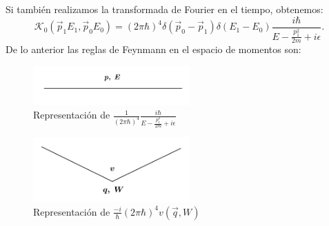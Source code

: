 Si también realizamos la transformada de Fourier en el tiempo, obtenemos:
\begin{equation}
\mathcal{K}_0(\vec{p}_1E_1,\vec{p}_0E_0)=(2\pi\hbar)^4\delta(\vec{p}_0-\vec{p}_1)\delta(E_1-E_0)\frac{i\hbar}{E-\frac{p_{1}^{2}}{2m}+i\epsilon}.
\end{equation}
De lo anterior las reglas de Feynmann en el espacio de momentos son:
\begin{figure}
\caption[Diagrama de Feynmann primera cuantización]{Representación de $\frac{1}{(2\pi\hbar)^4}\frac{i\hbar}{E-\frac{p_{1}^{2}}{2m}+i\epsilon}$}
\includegraphics[width=6cm]{Imagenes/Fig6}
\end{figure}
\begin{figure}
\caption[Diagrama de Feynmann primera cuantización]{Representación de $\frac{-i}{\hbar}(2\pi\hbar)^4v(\vec{q},W)$}
\includegraphics[width=6cm]{Imagenes/Fig7}
\end{figure}

